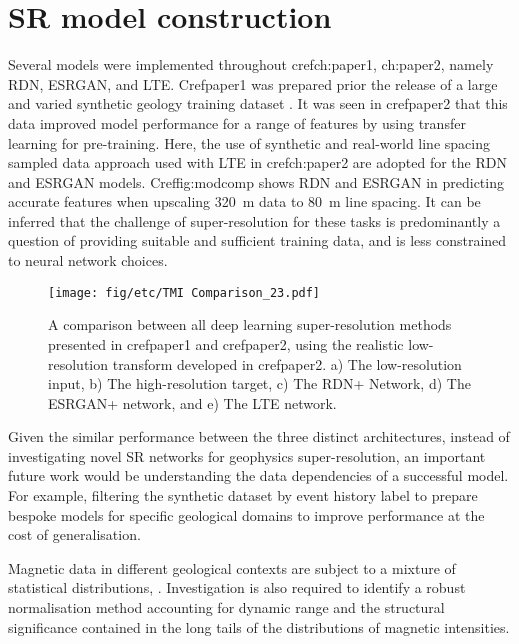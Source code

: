 \section{SR model construction}
Several models were implemented throughout cref{ch:paper1, ch:paper2}, namely RDN, ESRGAN, and LTE\@.
Cref{paper1} was prepared prior the release of a large and varied synthetic geology training dataset \parencite{jessellNoddyverseMassiveData2022}.
It was seen in cref{paper2} that this data improved model performance for a range of features by using transfer learning for pre-training.
Here, the use of synthetic and real-world line spacing sampled data approach used with LTE in cref{ch:paper2} are adopted for the RDN and ESRGAN models.
Cref{fig:modcomp} shows RDN and ESRGAN in predicting accurate features when upscaling \qty{320}{\m} data to \qty{80}{\m} line spacing.
It can be inferred that the challenge of super-resolution for these tasks is predominantly a question of providing suitable and sufficient training data, and is less constrained to neural network choices.

\begin{figure}
    \texttt{[image: fig/etc/TMI Comparison\_23.pdf]} %
    \caption{
        A comparison between all deep learning super-resolution methods presented in cref{paper1} and cref{paper2}, using the realistic low-resolution transform developed in cref{paper2}.
        a) The low-resolution input, b) The high-resolution target, c) The RDN+ Network, d) The ESRGAN+ network, and e) The LTE network.}
    \label{fig:modcomp}
\end{figure}

Given the similar performance between the three distinct architectures, instead of investigating novel SR networks for geophysics super-resolution, an important future work would be understanding the data dependencies of a successful model. For example, filtering the synthetic dataset by event history label to prepare bespoke models for specific geological domains to improve performance at the cost of generalisation.

Magnetic data in different geological contexts are subject to a mixture of statistical distributions, \parencite{khokhlovCauseNonGaussianDistribution2017}. Investigation is also required to identify a robust normalisation method accounting for dynamic range and the structural significance contained in the long tails of the distributions of magnetic intensities.

